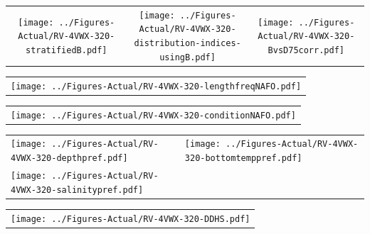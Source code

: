 \documentclass[12pt]{article}\usepackage[]{graphicx}\usepackage[]{color}
\begin{document}
\vspace{1cm}
\begin{minipage}{1.0\textwidth}
 \begin{tabular}{ccc}
\texttt{[image: ../Figures-Actual/RV-4VWX-320-stratifiedB.pdf]} & 
\texttt{[image: ../Figures-Actual/RV-4VWX-320-distribution-indices-usingB.pdf]} & 
\texttt{[image: ../Figures-Actual/RV-4VWX-320-BvsD75corr.pdf]} \\ 
\end{tabular} 
\end{minipage}
\clearpage
\begin{minipage}{1.0\textwidth}
 \begin{tabular}{c}
\texttt{[image: ../Figures-Actual/RV-4VWX-320-lengthfreqNAFO.pdf]} \\ 
\end{tabular} 
\end{minipage}
\newline

\vspace{1cm}
\begin{minipage}{1.0\textwidth}
 \begin{tabular}{c}
\texttt{[image: ../Figures-Actual/RV-4VWX-320-conditionNAFO.pdf]} \\ 
\end{tabular} 
\end{minipage}
\clearpage
\begin{minipage}{1.0\textwidth}
 \begin{tabular}[t]{m{3in}m{3in}}
\texttt{[image: ../Figures-Actual/RV-4VWX-320-depthpref.pdf]} & 
\texttt{[image: ../Figures-Actual/RV-4VWX-320-bottomtemppref.pdf]} \\ 
\texttt{[image: ../Figures-Actual/RV-4VWX-320-salinitypref.pdf]} & 
 \\ 
\end{tabular} 
\end{minipage}
\newline

\vspace{1cm}
\begin{minipage}{1.0\textwidth}
 \begin{tabular}{c}
\texttt{[image: ../Figures-Actual/RV-4VWX-320-DDHS.pdf]} \\ 
\end{tabular} 
\end{minipage}
\clearpage
\end{document}
